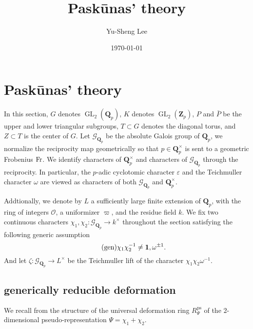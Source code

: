 \documentclass[leqno]{amsart}
\newcommand{\Gp}{\mathcal{G}_{\Qp}} %
\newcommand{\Fr}{\textnormal{Fr}} %
\DeclareMathOperator{\ps}{ps}
\DeclareMathOperator{\GL}{GL}
\newcommand{\Qp}{\mathbf{Q}_p}
\newcommand{\Zp}{\mathbf{Z}_p}
\newcommand{\oo}{\mathcal O}
\newcommand{\id}{\mathbf{1}}
\newcommand{\1}{\mathbf{1}}
\theoremstyle{definition}
\theoremstyle{remark}
\begin{document}
\title{Pask\={u}nas' theory}
\author[Y-S.~Lee]{Yu-Sheng Lee}
\address{Department of Mathematics, University  of Michigan, Ann Arbor, MI 48109, USA}
\date{\today}

\maketitle
\setcounter{tocdepth}{1}
\tableofcontents





\section{Pask\={u}nas' theory}

In this section,
$G$ denotes  $\GL_2(\Qp)$, 
$K$ denotes  $\GL_2(\Zp)$,  
$P$ and  $\bar{P}$ 
be the upper and lower triangular subgroups,
$T\subset G$ denotes the diagonal torus,
and  $Z\subset T$ is the center of  $G$.
Let  $\Gp$ be the absolute Galois group of  $\Qp$,
we normalize the reciprocity map  geometrically
so that  $p\in \Qp^\times$
is sent to a geometric Frobenius  $\Fr$.
We identify characters of  $\Qp^\times$
and characters of  $\Gp$ through the reciprocity.
In particular, 
the $p$-adic cyclotomic character $\varepsilon$ 
and the Teichmuller character $\omega$
are viewed as characters of both  $\Gp$ and  $\Qp^\times$.

Addtionally,
we denote by $L$ a sufficiently large 
finite extension of  $\Qp$,
with the ring of integers  $\oo$,
a uniformizer  $\varpi$,
and the residue field $k$.
We fix 
two continuous characters
$\chi_1,\chi_2\colon \Gp\to k^\times$ 
throughout the section satisfying
the following generic assumption
\begin{equation}\label{cond:generic}\tag{\text{gen}}
	\chi_1\chi_2^{-1}\neq \id,\omega^{\pm1}.
\end{equation}
And let $\zeta\colon \Gp\to L^\times$
be the Teichmuller lift of the character  $\chi_1\chi_2\omega^{-1}$.



\subsection{generically reducible deformation}

We recall from \cite[\S B.1]{pask}
the structure of the universal deformation ring $R_{\Psi}^{\ps}$
of the $2$-dimensional pseudo-representation $\Psi=\chi_1+\chi_2$. 
\end{document}
